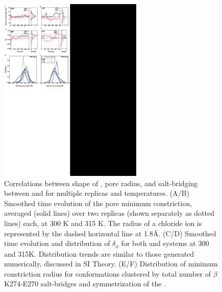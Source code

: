 \documentclass[9pt,twocolumn,twoside,lineno]{pnas-new}
\begin{document}
\begin{figure}[t]
\centering
\includegraphics[height = 3.5in]{figures_2/Pillar_4_fig}
\caption{Correlations between shape of \fiveringnos, pore radius, and salt-bridging between \fivering and \triad for multiple replicas and temperatures.  (A/B) Smoothed time evolution of the pore minimum constriction, averaged (solid lines) over two replicas (shown separately as dotted lines) each, at 300 K and 315 K. 
The radius of a chloride ion is represented by the dashed horizontal line at 1.8\AA. 
(C/D) Smoothed time evolution and distribution of $\delta_{\phi}$ for both \WT and \MT systems at 300 and 315K. Distribution trends are similar to those generated numerically, discussed in SI Theory.  %
(E/F) Distribution of minimum constriction radius for conformations clustered by total number of $\beta$ K274-E270 salt-bridges and symmetrization of the \fiveringnos. }%
\label{fig:Pillar_3_fig}
\end{figure}
\end{document}

